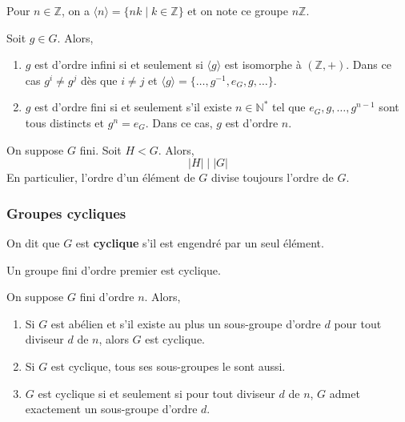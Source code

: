   \begin{example}
    Pour $n \in \mathbb{Z}$, on a $\langle n \rangle = \{ nk \mid k \in \mathbb{Z} \}$ et on note ce groupe $n\mathbb{Z}$.
  \end{example}


  \begin{theorem}
    \label{104-1}
    Soit $g \in G$. Alors,
    \begin{enumerate}[label={\bfseries(\roman*)}]
      \item $g$ est d'ordre infini si et seulement si $\langle g \rangle$ est isomorphe à $(\mathbb{Z}, +)$. Dans ce cas $g^i \neq g^j$ dès que $i \neq j$ et $\langle g \rangle = \{ \dots, g^{-1}, e_G, g, \dots \}$.
      \item \label{104-2} $g$ est d'ordre fini si et seulement s'il existe $n \in \mathbb{N}^*$ tel que $e_G, g, \dots, g^{n-1}$ sont tous distincts et $g^n = e_G$. Dans ce cas, $g$ est d'ordre $n$.
    \end{enumerate}
  \end{theorem}


  \begin{theorem}
    On suppose $G$ fini. Soit $H < G$. Alors,
    \[ |H| \mid |G| \]
    En particulier, l'ordre d'un élément de $G$ divise toujours l'ordre de $G$.
  \end{theorem}

  \subsubsection{Groupes cycliques}


  \begin{definition}
    On dit que $G$ est \textbf{cyclique} s'il est engendré par un seul élément.
  \end{definition}


  \begin{proposition}
    Un groupe fini d'ordre premier est cyclique.
  \end{proposition}

  \begin{theorem}
    On suppose $G$ fini d'ordre $n$. Alors,
    \begin{enumerate}[label={\bfseries(\roman*)}]
      \item Si $G$ est abélien et s'il existe au plus un sous-groupe d'ordre $d$ pour tout diviseur $d$ de $n$, alors $G$ est cyclique.
      \item Si $G$ est cyclique, tous ses sous-groupes le sont aussi.
      \item $G$ est cyclique si et seulement si pour tout diviseur $d$ de $n$, $G$ admet exactement un sous-groupe d'ordre $d$.
    \end{enumerate}
  \end{theorem}

